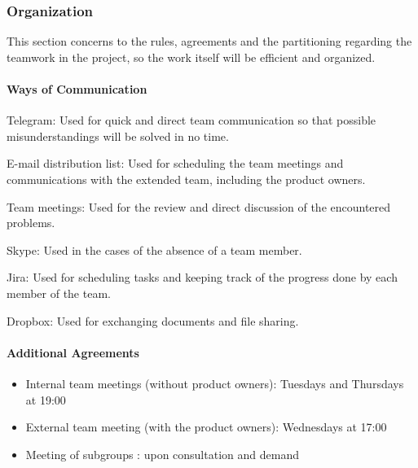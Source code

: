 \newpage

\subsubsection{Organization}

This section concerns to the rules, agreements and the partitioning regarding the teamwork in the project, so the work itself will be efficient and organized. 

\paragraph{Ways of Communication}
\begin{aims}
	\item[Telegram:] Used for quick and direct team communication so that possible misunderstandings will be solved in no time.
	
	\item[E-mail distribution list:] Used for scheduling the team meetings and communications with the extended team, including the product owners. 
	
	\item[Team meetings:] Used for the review and direct discussion of the encountered problems. 
	
	\item[Skype:] Used in the cases of the absence of a team member. 
	
	\item [Jira:] Used for scheduling tasks and keeping track of the progress done by each member of the team.
	
	\item[Dropbox:] Used for exchanging documents and file sharing.  
\end{aims}

\paragraph{Additional Agreements}
\begin{itemize}
	\item Internal team meetings (without product owners): Tuesdays and Thursdays at 19:00
	
	\item External team meeting (with the product owners): Wednesdays at 17:00
	
	\item Meeting of subgroups : upon consultation and demand 
\end{itemize}


